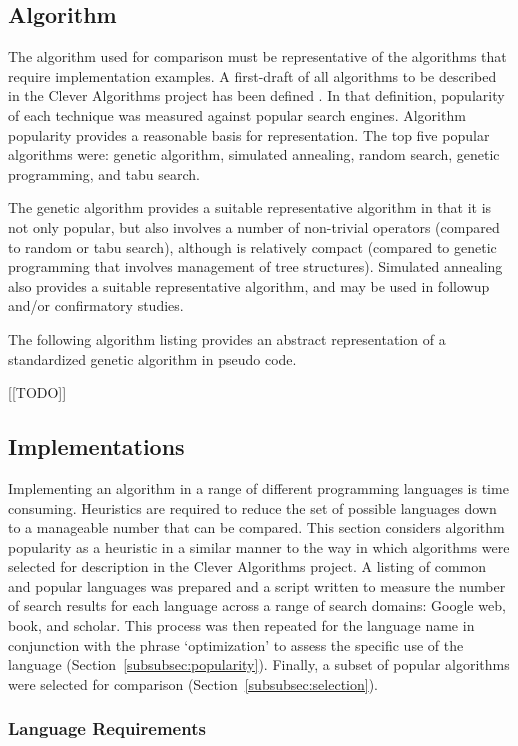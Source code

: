 \documentclass[a4paper, 11pt]{article}
\begin{document}
% 
% 
\subsection{Algorithm}
The algorithm used for comparison must be representative of the algorithms that require implementation examples. A first-draft of all algorithms to be described in the Clever Algorithms project has been defined \cite{Brownlee2010a}. In that definition, popularity of each technique was measured against popular search engines. Algorithm popularity provides a reasonable basis for representation. The top five popular algorithms were: genetic algorithm, simulated annealing, random search, genetic programming, and tabu search.

The genetic algorithm provides a suitable representative algorithm in that it is not only popular, but also involves a number of non-trivial operators (compared to random or tabu search), although is relatively compact (compared to genetic programming that involves management of tree structures). Simulated annealing also provides a suitable representative algorithm, and may be used in followup and/or confirmatory studies. 

The following algorithm listing provides an abstract representation of a standardized genetic algorithm in pseudo code.

[[TODO]]


% 
% 
\subsection{Implementations}
Implementing an algorithm in a range of different programming languages is time consuming. Heuristics are required to reduce the set of possible languages down to a manageable number that can be compared.
This section considers algorithm popularity as a heuristic in a similar manner to the way in which algorithms were selected for description in the Clever Algorithms project. A listing of common and popular languages was prepared and a script written to measure the number of search results for each language across a range of search domains: Google web, book, and scholar. This process was then repeated for the language name in conjunction with the phrase `optimization' to assess the specific use of the language (Section~\ref{subsubsec:popularity}). Finally, a subset of popular algorithms were selected for comparison (Section~\ref{subsubsec:selection}).

\subsubsection{Language Requirements}
\label{subsubsec:requirements}
\end{document}
